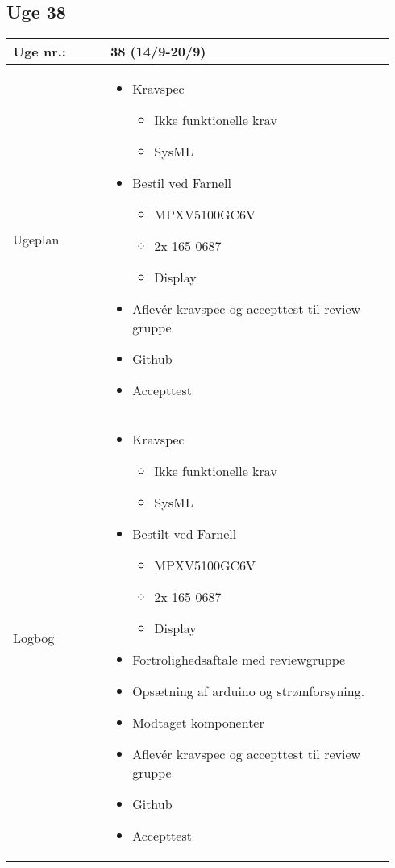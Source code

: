 	\subsection{Uge 38}
	\begin{longtable}{|p{0.24\linewidth}|p{0.7\linewidth}|}
		\hline
		Uge nr.: & 38 (14/9-20/9)\\ \hline
		Ugeplan & 
		\begin{itemize}
			\item Kravspec
			\begin{itemize}
				\item Ikke funktionelle krav
				\item SysML
			\end{itemize}
			\item Bestil ved Farnell
			\begin{itemize}
				\item MPXV5100GC6V
				\item 2x 165-0687
				\item Display
			\end{itemize}
			\item Aflevér kravspec og accepttest til review gruppe
			\item Github
			\item Accepttest
		\end{itemize}
		\\ \hline
		Logbog & 
		\begin{itemize}
				\item Kravspec
				\begin{itemize}
					\item Ikke funktionelle krav
					\item SysML
				\end{itemize}
				\item Bestilt ved Farnell
				\begin{itemize}
					\item MPXV5100GC6V
					\item 2x 165-0687
					\item Display
				\end{itemize}
				\item Fortrolighedsaftale med reviewgruppe
				\item Opsætning af arduino og strømforsyning.
				\item Modtaget komponenter
				\item Aflevér kravspec og accepttest til review gruppe
				\item Github
				\item Accepttest
		\end{itemize}
		\\ \hline
	\end{longtable}
	

